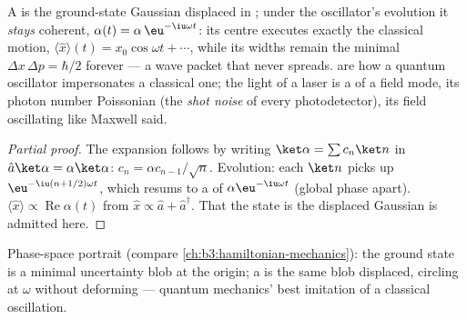 \begin{proposition}\label{prop:b3:harmonic-oscillator:coherent-motion}
A  is the ground-state Gaussian displaced in ; under the oscillator's evolution it \emph{stays} coherent,
$\alpha(t) = \alpha\,\eu^{-\iu\omega t}$: its centre executes exactly
the classical motion, $\langle\hat x\rangle(t) =
x_0\cos\omega t + \cdots$, while its widths remain the minimal
$\Delta x\,\Delta p = \hbar/2$ forever --- a wave packet that never
spreads.  are how a quantum oscillator impersonates a
classical one; the light of a laser is a  of a field
mode, its photon number Poissonian (the \emph{shot noise} of every
photodetector), its field oscillating like Maxwell said.
\end{proposition}

\begin{proof}[Partial proof]
The expansion follows by writing $\ket\alpha = \sum c_n\ket n$ in
$\hat a\ket\alpha = \alpha\ket\alpha$: $c_n = \alpha c_{n-1}/\sqrt
n$. Evolution: each $\ket n$ picks up $\eu^{-\iu(n + 1/2)\omega t}$,
which resums to a  of $\alpha\eu^{-\iu\omega t}$
(global phase apart). $\langle\hat x\rangle \propto
\operatorname{Re}\alpha(t)$ from $\hat x \propto \hat a +
\hat a^\dagger$. That the state is the displaced Gaussian is
admitted here.
\end{proof}

\begin{omfigure}

{\small Phase-space portrait (compare
\cref{ch:b3:hamiltonian-mechanics}): the ground state is a minimal
uncertainty blob at the origin; a  is the same blob
displaced, circling at $\omega$ without deforming --- quantum
mechanics' best imitation of a classical oscillation.}
\end{omfigure}

